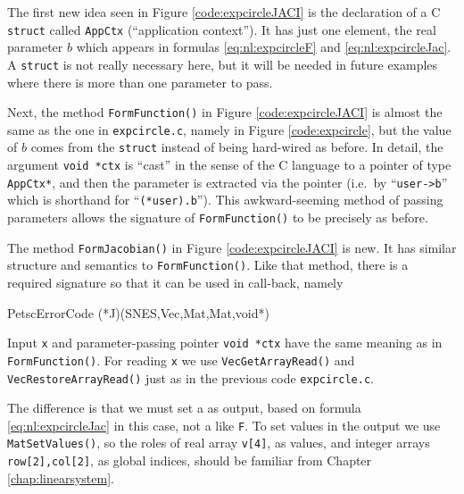The first new idea seen in Figure \ref{code:expcircleJACI} is the declaration of a C \texttt{struct} called \texttt{AppCtx} (``application context'').  It has just one element, the real parameter $b$ which appears in formulas \eqref{eq:nl:expcircleF} and \eqref{eq:nl:expcircleJac}.  A \texttt{struct} is not really necessary here, but it will be needed in future examples where there is more than one parameter to pass.


Next, the method \texttt{FormFunction()} in Figure \ref{code:expcircleJACI} is almost the same as the one in \texttt{expcircle.c}, namely in Figure \ref{code:expcircle}, but the value of $b$ comes from the \texttt{struct} instead of being hard-wired as before.  In detail, the argument \texttt{void *ctx} is ``cast'' in the sense of the C language \citep{KernighanRitchie1988} to a pointer of type \texttt{AppCtx*}, and then the parameter is extracted via the pointer (i.e.~by ``\texttt{user->b}'' which is shorthand for ``\texttt{(*user).b}'').  This awkward-seeming method of passing parameters allows the signature of \texttt{FormFunction()} to be precisely as before.


The method \texttt{FormJacobian()} in Figure \ref{code:expcircleJACI} is new.  It has similar structure and semantics to \texttt{FormFunction()}.  Like that method, there is a required signature so that it can be used in call-back, namely
\begin{code}
PetscErrorCode (*J)(SNES,Vec,Mat,Mat,void*)
\end{code}
Input \pVec \texttt{x} and parameter-passing pointer \texttt{void *ctx} have the same meaning as in \texttt{FormFunction()}.  For reading \texttt{x} we use \texttt{VecGetArrayRead()} and \texttt{VecRestoreArrayRead()} just as in the previous code \texttt{expcircle.c}.

The difference is that we must set a \pMat as output, based on formula \eqref{eq:nl:expcircleJac} in this case, not a \pVec like \texttt{F}.  To set values in the output \pMat we use \texttt{MatSetValues()}, so the roles of real array \texttt{v[4]}, as values, and integer arrays \texttt{row[2],col[2]}, as global indices, should be familiar from Chapter \ref{chap:linearsystem}.

